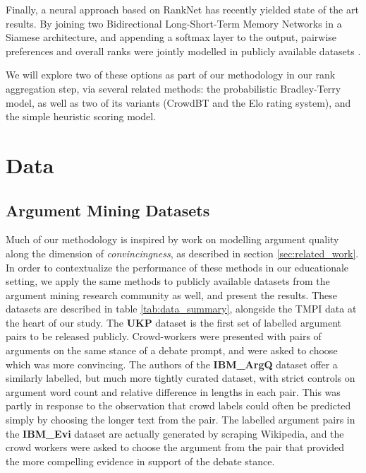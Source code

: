 \documentclass[notitlepage,12pt]{jedm}
\begin{document}
Finally, a neural approach based on RankNet has recently yielded state of the 
art results. By joining two Bidirectional Long-Short-Term Memory Networks in a 
Siamese architecture, and appending a softmax layer to the output, pairwise 
preferences and overall ranks were jointly modelled in publicly available 
datasets \cite{gleize_are_2019}.

We will explore two of these options as part of our methodology in our rank 
aggregation step, via several related methods: 
the probabilistic Bradley-Terry model, as well as two of its variants (CrowdBT 
and the Elo rating system), and the simple heuristic scoring model.


\section{Data}\label{sec:datasets}

\subsection{Argument Mining Datasets}
Much of our methodology is inspired by work on modelling argument quality along 
the dimension of \textit{convincingness}, as described in section 
\ref{sec:related_work}. 
In order to contextualize the performance of these methods in our educationale 
setting, we apply the same methods to publicly available datasets from the 
argument mining research community as well, and present the results. 
These datasets are described in table \ref{tab:data_summary}, alongside the 
TMPI data at the heart of our study. 
The \textbf{UKP} dataset\cite{habernal_which_2016} is the first set of labelled 
argument pairs to be released publicly.
Crowd-workers were presented with pairs of arguments on the same stance of a 
debate prompt, and were asked to choose which was more convincing.
The authors of the \textbf{IBM\_ArgQ} dataset\cite{toledo_automatic_2019} offer 
a similarly labelled, but much more tightly curated dataset, with strict 
controls on argument word count and relative difference in lengths in each pair.
This was partly in response to the observation that crowd labels could often be 
predicted simply by choosing the longer text from the pair.
The labelled argument pairs in the \textbf{IBM\_Evi} dataset 
\cite{gleize_are_2019} are actually generated by scraping Wikipedia, and the 
crowd workers were asked to choose the argument from the pair that provided the 
more compelling evidence in support of the debate stance.
\end{document}
